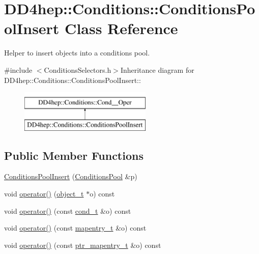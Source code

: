 \hypertarget{class_d_d4hep_1_1_conditions_1_1_conditions_pool_insert}{
\section{DD4hep::Conditions::ConditionsPoolInsert Class Reference}
\label{class_d_d4hep_1_1_conditions_1_1_conditions_pool_insert}
}


Helper to insert objects into a conditions pool.  


{\ttfamily \#include $<$ConditionsSelectors.h$>$}Inheritance diagram for DD4hep::Conditions::ConditionsPoolInsert::\begin{figure}[H]
\begin{center}
\leavevmode
\includegraphics[height=2cm]{class_d_d4hep_1_1_conditions_1_1_conditions_pool_insert}
\end{center}
\end{figure}
\subsection*{Public Member Functions}
\begin{DoxyCompactItemize}
\item 
\hyperlink{class_d_d4hep_1_1_conditions_1_1_conditions_pool_insert_aab6b0dc7865e247803d2ba6e37ef403d}{ConditionsPoolInsert} (\hyperlink{class_d_d4hep_1_1_conditions_1_1_conditions_pool}{ConditionsPool} \&p)
\item 
void \hyperlink{class_d_d4hep_1_1_conditions_1_1_conditions_pool_insert_a2a327243ab28fee758060e728cb96729}{operator()} (\hyperlink{class_d_d4hep_1_1_conditions_1_1_interna_1_1_condition_object}{object\_\-t} $\ast$o) const 
\item 
void \hyperlink{class_d_d4hep_1_1_conditions_1_1_conditions_pool_insert_ab87be01d46494de9dfc93d4a2b554843}{operator()} (const \hyperlink{class_d_d4hep_1_1_conditions_1_1_condition}{cond\_\-t} \&o) const 
\item 
void \hyperlink{class_d_d4hep_1_1_conditions_1_1_conditions_pool_insert_a0164654db9934344ba4189b52e4b292e}{operator()} (const \hyperlink{class_d_d4hep_1_1_conditions_1_1_cond_____oper_a877dac3da66795207aed15be219acbdc}{mapentry\_\-t} \&o) const 
\item 
void \hyperlink{class_d_d4hep_1_1_conditions_1_1_conditions_pool_insert_a5615cc1a9788b6d79e3e98fc44bb3468}{operator()} (const \hyperlink{class_d_d4hep_1_1_conditions_1_1_cond_____oper_a0949e4bd5f90cd3fae2394cf30983973}{ptr\_\-mapentry\_\-t} \&o) const 
\end{DoxyCompactItemize}
